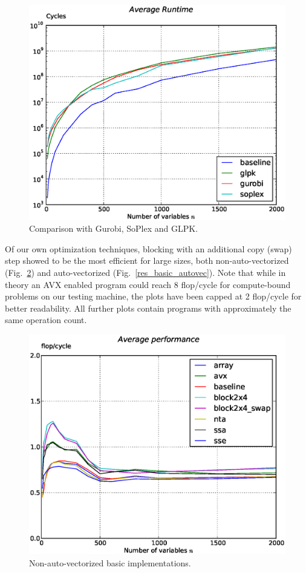 \documentclass[letterpaper]{article}
\begin{document}
\begin{figure}\centering
  \includegraphics[scale=0.4]{img/results_compare_external.eps}
  \caption{Comparison with Gurobi, SoPlex and GLPK.\label{res_external}}
\end{figure}


Of our own optimization techniques, blocking with an additional copy (swap) step showed to be the most efficient for large sizes,
both non-auto-vectorized (Fig.~\ref{res_basic_novec}) and auto-vectorized (Fig.~\ref{res_basic_autovec}).
Note that while in theory an AVX enabled program could reach 8 flop/cycle for compute-bound problems on our testing machine, the plots have been capped at 2 flop/cycle for better readability.
All further plots contain programs with approximately the same operation count.

\begin{figure}\centering
  \includegraphics[scale=0.4]{img/results_basic_novec.eps}
  \caption{Non-auto-vectorized basic implementations.\label{res_basic_novec}}
\end{figure}
\end{document}
